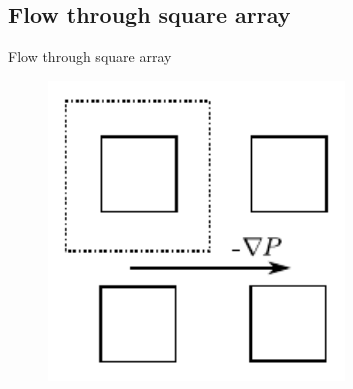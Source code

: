 \subsection{Flow through square array}

\begin{frame}{Flow through square array}

\begin{figure}
\begin{center}
\includegraphics[width=0.7\textwidth]{../fig/square_setup.pdf}
\end{center}

\end{figure}

\end{frame}

